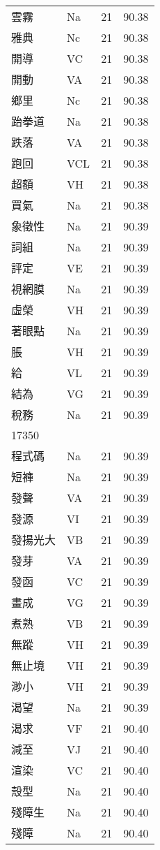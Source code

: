 \documentclass[twocolumn]{book}
\begin{document}
\begin{supertabular}{llrr}
雲霧 & Na & 21 &  90.38\\
雅典 & Nc & 21 &  90.38\\
開導 & VC & 21 &  90.38\\
開動 & VA & 21 &  90.38\\
鄉里 & Nc & 21 &  90.38\\
跆拳道 & Na & 21 &  90.38\\
跌落 & VA & 21 &  90.38\\
跑回 & VCL & 21 &  90.38\\
超額 & VH & 21 &  90.38\\
買氣 & Na & 21 &  90.38\\
象徵性 & Na & 21 &  90.39\\
詞組 & Na & 21 &  90.39\\
評定 & VE & 21 &  90.39\\
視網膜 & Na & 21 &  90.39\\
虛榮 & VH & 21 &  90.39\\
著眼點 & Na & 21 &  90.39\\
脹 & VH & 21 &  90.39\\
給 & VL & 21 &  90.39\\
結為 & VG & 21 &  90.39\\
稅務 & Na & 21 &  90.39\\
17350\\
程式碼 & Na & 21 &  90.39\\
短褲 & Na & 21 &  90.39\\
發聲 & VA & 21 &  90.39\\
發源 & VI & 21 &  90.39\\
發揚光大 & VB & 21 &  90.39\\
發芽 & VA & 21 &  90.39\\
發函 & VC & 21 &  90.39\\
畫成 & VG & 21 &  90.39\\
煮熟 & VB & 21 &  90.39\\
無蹤 & VH & 21 &  90.39\\
無止境 & VH & 21 &  90.39\\
渺小 & VH & 21 &  90.39\\
渴望 & Na & 21 &  90.39\\
渴求 & VF & 21 &  90.40\\
減至 & VJ & 21 &  90.40\\
渲染 & VC & 21 &  90.40\\
殼型 & Na & 21 &  90.40\\
殘障生 & Na & 21 &  90.40\\
殘障 & Na & 21 &  90.40\\

\end{supertabular}
\end{document}
